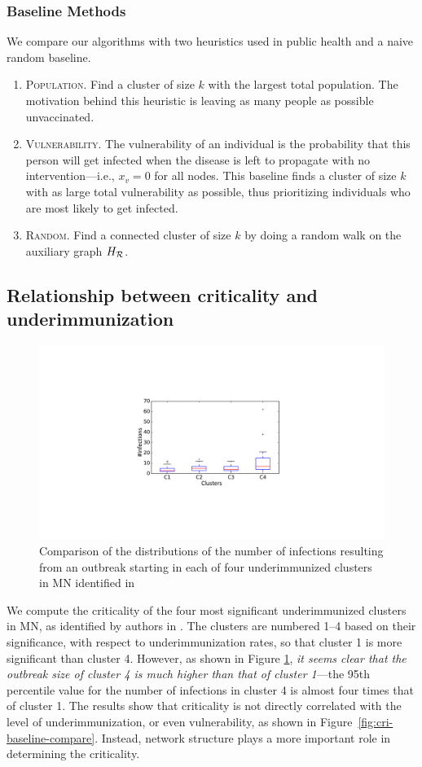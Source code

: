 \subsubsection{Baseline Methods}
We compare our algorithms with two heuristics used in public health and a naive random baseline.
\begin{enumerate}
\item \textsc{Population.} Find a cluster of size $k$ with the largest total population.
The motivation behind this heuristic is leaving as many people as possible unvaccinated.

\item \textsc{Vulnerability.} The vulnerability of an individual is the probability that this person will get infected when the disease is left to propagate with no intervention---i.e., $x_v = 0$ for all nodes. This baseline finds a cluster of size $k$ with as large total vulnerability as possible, thus prioritizing individuals who are most likely to get infected. 
\item \textsc{Random.} Find a connected cluster of size $k$ by doing a random walk on the auxiliary graph $H_{\mathcal{R}}$.
\end{enumerate}

\subsection{Relationship between criticality and underimmunization}
\begin{figure}
\centering
\includegraphics[width=.3\textwidth]{img/criticality-schools-mn.pdf}
\vspace{-.15in}
\caption{Comparison of the distributions of the number of infections resulting from an outbreak starting in each of four underimmunized clusters in MN identified in \cite{cadena:vacc-cluster}}
\label{fig:criticality-compare}
\end{figure}

We compute the criticality of the four most significant underimmunized clusters in MN, as identified by authors in \cite{cadena:vacc-cluster}.
The clusters are numbered 1--4 based on their significance, with respect to
underimmunization rates, so that cluster 1 is more significant than cluster 4.
However, as shown in Figure \ref{fig:criticality-compare},
\emph{it seems clear that the outbreak size of cluster 4 is much higher than
that of cluster 1}---the 95th percentile value for the number of infections in
cluster 4 is almost four times that of cluster 1. The results show that criticality is not directly 
correlated with the level of underimmunization, or even vulnerability, as shown in Figure~\ref{fig:cri-baseline-compare}. Instead, network structure plays a more important role in determining 
the criticality. 

